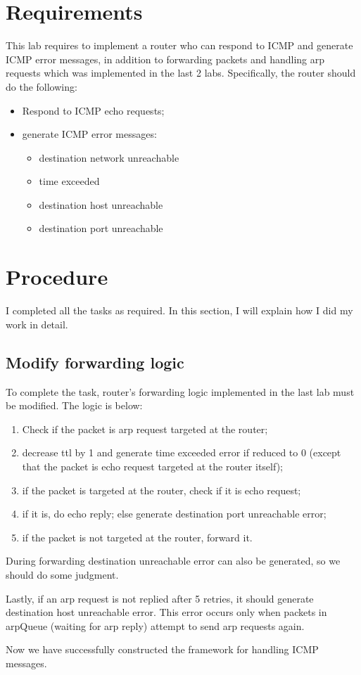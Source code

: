\documentclass[12pt,a4paper,UTF8]{article}
\begin{document}
\section{Requirements}
	This lab requires to implement a router who can respond to ICMP and generate ICMP error messages, in addition to forwarding packets and handling arp requests which was implemented in the last 2 labs. Specifically, the router should do the following:
\begin{itemize}
	\item Respond to ICMP echo requests;
	\item generate ICMP error messages:
	\begin{itemize}
		\item destination network unreachable
		\item time exceeded
		\item destination host unreachable
		\item destination port unreachable
	\end{itemize}
\end{itemize}

\section{Procedure}
I completed all the tasks as required.
In this section, I will explain how I did my work in detail.

\subsection{Modify forwarding logic}
To complete the task, router's forwarding logic implemented in the last lab must be modified.
The logic is below:
\begin{enumerate}
	\item Check if the packet is arp request targeted at the router;
	\item decrease ttl by 1 and generate time exceeded error if reduced to 0 (except that the packet is echo request targeted at the router itself);
	\item if the packet is targeted at the router, check if it is echo request;
	\item if it is, do echo reply; else generate destination port unreachable error;
	\item if the packet is not targeted at the router, forward it.
\end{enumerate}

During forwarding destination unreachable error can also be generated, so we should do some judgment.

Lastly, if an arp request is not replied after 5 retries, it should generate destination host unreachable error. This error occurs only when packets in arpQueue (waiting for arp reply) attempt to send arp requests again.

Now we have successfully constructed the framework for handling ICMP messages.
\end{document}
